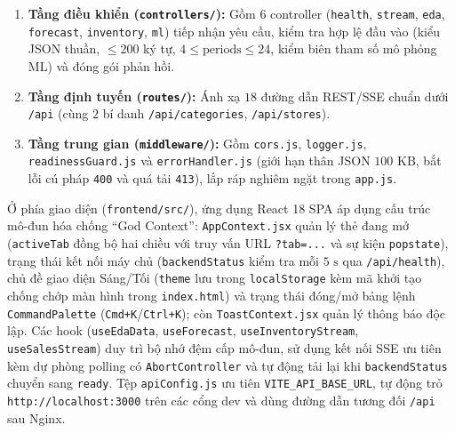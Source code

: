 \begin{enumerate}[label=\textit{\arabic*},topsep=0pt, itemsep=1pt]
	\item \textbf{Tầng điều khiển (\texttt{controllers/}):} Gồm $6$ controller (\texttt{health}, \texttt{stream}, \texttt{eda}, \texttt{forecast}, \texttt{inventory}, \texttt{ml}) tiếp nhận yêu cầu, kiểm tra hợp lệ đầu vào (kiểu JSON thuần, $\le 200$ ký tự, $4 \le \text{periods} \le 24$, kiểm biên tham số mô phỏng ML) và đóng gói phản hồi.
	\item \textbf{Tầng định tuyến (\texttt{routes/}):} Ánh xạ $18$ đường dẫn REST/SSE chuẩn dưới \texttt{/api} (cùng $2$ bí danh \texttt{/api/categories}, \texttt{/api/stores}).
	\item \textbf{Tầng trung gian (\texttt{middleware/}):} Gồm \texttt{cors.js}, \texttt{logger.js}, \texttt{readinessGuard.js} và \texttt{errorHandler.js} (giới hạn thân JSON $100\text{ KB}$, bắt lỗi cú pháp \texttt{400} và quá tải \texttt{413}), lắp ráp nghiêm ngặt trong \texttt{app.js}.
\end{enumerate}

\indent Ở phía giao diện (\texttt{frontend/src/}), ứng dụng React 18 SPA áp dụng cấu trúc mô-đun hóa chống ``God Context'': \texttt{AppContext.jsx} quản lý thẻ đang mở (\texttt{activeTab} đồng bộ hai chiều với truy vấn URL \texttt{?tab=...} và sự kiện \texttt{popstate}), trạng thái kết nối máy chủ (\texttt{backendStatus} kiểm tra mỗi $5\text{ s}$ qua \texttt{/api/health}), chủ đề giao diện Sáng/Tối (\texttt{theme} lưu trong \texttt{localStorage} kèm mã khởi tạo chống chớp màn hình trong \texttt{index.html}) và trạng thái đóng/mở bảng lệnh \texttt{CommandPalette} (\texttt{Cmd+K}/\texttt{Ctrl+K}); còn \texttt{ToastContext.jsx} quản lý thông báo độc lập. Các hook (\texttt{useEdaData}, \texttt{useForecast}, \texttt{useInventoryStream}, \texttt{useSalesStream}) duy trì bộ nhớ đệm cấp mô-đun, sử dụng kết nối SSE ưu tiên kèm dự phòng polling có \texttt{AbortController} và tự động tải lại khi \texttt{backendStatus} chuyển sang \texttt{ready}. Tệp \texttt{apiConfig.js} ưu tiên \texttt{VITE_API_BASE_URL}, tự động trỏ \texttt{http://localhost:3000} trên các cổng dev và dùng đường dẫn tương đối \texttt{/api} sau Nginx.

